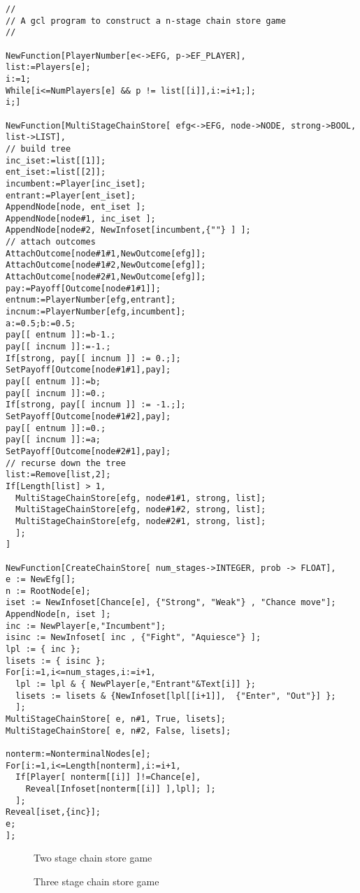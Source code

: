 \begin{verbatim}
//
// A gcl program to construct a n-stage chain store game
//

NewFunction[PlayerNumber[e<->EFG, p->EF_PLAYER],
list:=Players[e];
i:=1;
While[i<=NumPlayers[e] && p != list[[i]],i:=i+1;];
i;]

NewFunction[MultiStageChainStore[ efg<->EFG, node->NODE, strong->BOOL, list->LIST],
// build tree
inc_iset:=list[[1]];
ent_iset:=list[[2]];
incumbent:=Player[inc_iset];
entrant:=Player[ent_iset];
AppendNode[node, ent_iset ];
AppendNode[node#1, inc_iset ];
AppendNode[node#2, NewInfoset[incumbent,{""} ] ];
// attach outcomes 
AttachOutcome[node#1#1,NewOutcome[efg]];
AttachOutcome[node#1#2,NewOutcome[efg]];
AttachOutcome[node#2#1,NewOutcome[efg]];
pay:=Payoff[Outcome[node#1#1]];
entnum:=PlayerNumber[efg,entrant];
incnum:=PlayerNumber[efg,incumbent];
a:=0.5;b:=0.5;
pay[[ entnum ]]:=b-1.;
pay[[ incnum ]]:=-1.;
If[strong, pay[[ incnum ]] := 0.;];
SetPayoff[Outcome[node#1#1],pay];
pay[[ entnum ]]:=b;
pay[[ incnum ]]:=0.;
If[strong, pay[[ incnum ]] := -1.;];
SetPayoff[Outcome[node#1#2],pay];
pay[[ entnum ]]:=0.;
pay[[ incnum ]]:=a;
SetPayoff[Outcome[node#2#1],pay];
// recurse down the tree
list:=Remove[list,2];
If[Length[list] > 1,
  MultiStageChainStore[efg, node#1#1, strong, list];
  MultiStageChainStore[efg, node#1#2, strong, list];
  MultiStageChainStore[efg, node#2#1, strong, list];
  ];
]

NewFunction[CreateChainStore[ num_stages->INTEGER, prob -> FLOAT],
e := NewEfg[];
n := RootNode[e];
iset := NewInfoset[Chance[e], {"Strong", "Weak"} , "Chance move"];
AppendNode[n, iset ];
inc := NewPlayer[e,"Incumbent"];
isinc := NewInfoset[ inc , {"Fight", "Aquiesce"} ];
lpl := { inc };
lisets := { isinc }; 
For[i:=1,i<=num_stages,i:=i+1,
  lpl := lpl & { NewPlayer[e,"Entrant"&Text[i]] };
  lisets := lisets & {NewInfoset[lpl[[i+1]],  {"Enter", "Out"}] };
  ];
MultiStageChainStore[ e, n#1, True, lisets];
MultiStageChainStore[ e, n#2, False, lisets];

nonterm:=NonterminalNodes[e];
For[i:=1,i<=Length[nonterm],i:=i+1,
  If[Player[ nonterm[[i]] ]!=Chance[e],
    Reveal[Infoset[nonterm[[i]] ],lpl]; ];
  ];	
Reveal[iset,{inc}];
e;
];

\end{verbatim}

\newpage
\begin{figure}[h]
\centerline{}
\caption{Two stage chain store game}
\end{figure}

\newpage
\begin{figure}[h]
\centerline{}
\caption{Three stage chain store game}
\end{figure}

\newpage




